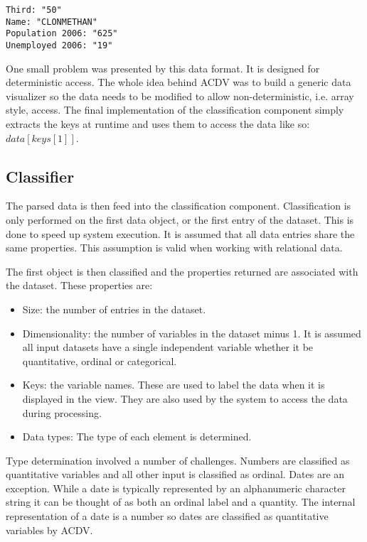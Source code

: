 \documentclass[a4paper, 11pt, titlepage, onehalfspacing]{report}
\begin{document}
\begin{verbatim}
Third: "50"
Name: "CLONMETHAN"
Population 2006: "625"
Unemployed 2006: "19"
\end{verbatim}

One small problem was presented by this data format. It is designed for deterministic access. The whole idea behind AC\lightning{}DV was to build a generic data visualizer so the data needs to be modified to allow non-deterministic, i.e. array style, access. The final implementation of the classification component simply extracts the keys at runtime and uses them to access the data like so: $data[keys[1]]$.  


\subsection{Classifier}
The parsed data is then feed into the classification component. Classification is only performed on the first data object, or the first entry of the dataset. This is done to speed up system execution. It is assumed that all data entries share the same properties. This assumption is valid when working with relational data.

The first object is then classified and the properties returned are associated with the dataset. These properties are:
\begin{itemize}
\item Size: the number of entries in the dataset.
\item Dimensionality: the number of variables in the dataset minus 1. It is assumed all input datasets have a single independent variable whether it be quantitative, ordinal or categorical.
\item Keys: the variable names. These are used to label the data when it is displayed in the view. They are also used by the system to access the data during processing.
\item Data types: The type of each element is determined. 
\end{itemize}

Type determination involved a number of challenges. Numbers are classified as quantitative variables and all other input is classified as ordinal. Dates are an exception. While a date is typically represented by an alphanumeric character string it can be thought of as both an ordinal label and a quantity. The internal representation of a date is a number so dates are classified as quantitative variables by AC\lightning{}DV. 
\end{document}
